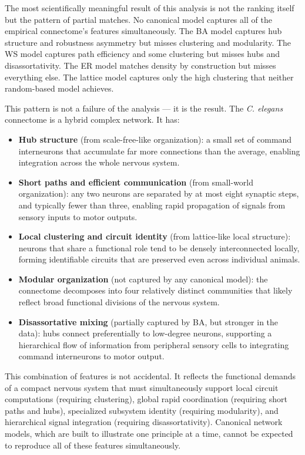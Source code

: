 \documentclass[12pt,a4paper]{report}
\begin{document}
The most scientifically meaningful result of this analysis is not the ranking itself but the pattern of partial matches. No canonical model captures all of the empirical connectome's features simultaneously. The BA model captures hub structure and robustness asymmetry but misses clustering and modularity. The WS model captures path efficiency and some clustering but misses hubs and disassortativity. The ER model matches density by construction but misses everything else. The lattice model captures only the high clustering that neither random-based model achieves.

This pattern is not a failure of the analysis — it is the result. The \textit{C. elegans} connectome is a hybrid complex network. It has:

\begin{itemize}
    \item \textbf{Hub structure} (from scale-free-like organization): a small set of command interneurons that accumulate far more connections than the average, enabling integration across the whole nervous system.
    \item \textbf{Short paths and efficient communication} (from small-world organization): any two neurons are separated by at most eight synaptic steps, and typically fewer than three, enabling rapid propagation of signals from sensory inputs to motor outputs.
    \item \textbf{Local clustering and circuit identity} (from lattice-like local structure): neurons that share a functional role tend to be densely interconnected locally, forming identifiable circuits that are preserved even across individual animals.
    \item \textbf{Modular organization} (not captured by any canonical model): the connectome decomposes into four relatively distinct communities that likely reflect broad functional divisions of the nervous system.
    \item \textbf{Disassortative mixing} (partially captured by BA, but stronger in the data): hubs connect preferentially to low-degree neurons, supporting a hierarchical flow of information from peripheral sensory cells to integrating command interneurons to motor output.
\end{itemize}

This combination of features is not accidental. It reflects the functional demands of a compact nervous system that must simultaneously support local circuit computations (requiring clustering), global rapid coordination (requiring short paths and hubs), specialized subsystem identity (requiring modularity), and hierarchical signal integration (requiring disassortativity). Canonical network models, which are built to illustrate one principle at a time, cannot be expected to reproduce all of these features simultaneously.
\end{document}

